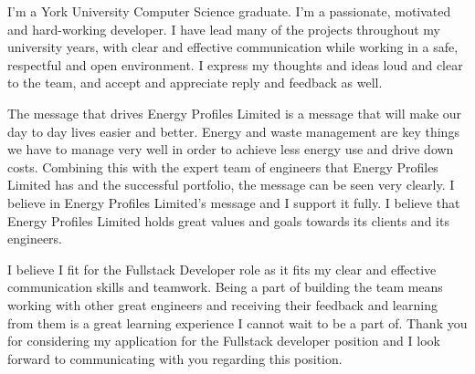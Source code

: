 \documentclass[11pt, a4paper]{awesome-cv}
\begin{document}
\makecvheader[R]

\makecvfooter
  {}
  {}
  {}

\makelettertitle

\begin{cvletter}

I'm a York University Computer Science graduate. I'm a passionate, motivated and hard-working developer. I have lead many of  the projects throughout my university years, with clear and effective communication while working in a safe, respectful and open environment. I express my thoughts and ideas loud and clear to the team, and accept and appreciate reply and feedback as well.

The message that drives Energy Profiles Limited is a message that will make our day to day lives easier and better. Energy and waste management are key things we have to manage very well in order to achieve less energy use and drive down costs. Combining this with the expert team of engineers that Energy Profiles Limited has and the successful portfolio, the message can be seen very clearly. I believe in Energy Profiles Limited's message and I support it fully. I believe that Energy Profiles Limited holds great values and goals towards its clients and its engineers.

I believe I fit for the Fullstack Developer role as it fits my clear and effective communication skills and teamwork. Being a part of building the team means working with other great engineers and receiving their feedback and learning from them is a great learning experience I cannot wait to be a part of. Thank you for considering my application for the Fullstack developer position and I look forward to communicating with you regarding this position.

\end{cvletter}


\makeletterclosing
\end{document}
